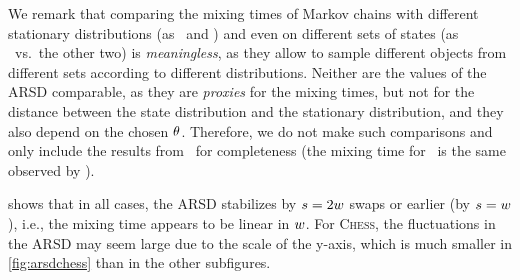 We remark that comparing the mixing times of Markov chains with different
stationary distributions (as \gioalgo\ and \naivealgo) and even on different
sets of states (as \ vs.\ the other two) is \emph{meaningless}, as they
allow to sample different objects from different sets according to different
distributions. Neither are the values of the ARSD comparable, as they are
\emph{proxies} for the mixing times, but not for the distance between the state
distribution and the stationary distribution, and they also depend on the chosen
$\theta$. Therefore, we do not make such comparisons and only include the
results from \gioalgo\ for completeness (the mixing time for
\gioalgo\ is the same observed by \citet[Sect.\ 5.1]{GionisMMT07}).

 shows that in all cases, the ARSD stabilizes by $s = 2
w$ swaps or earlier (by $s = w$), i.e., the mixing time
appears to be linear in $w$. For \textsc{Chess}, the fluctuations in the
ARSD may seem large due to the scale of the y-axis, which is much smaller in
\cref{fig:arsdchess} than in the other subfigures.
